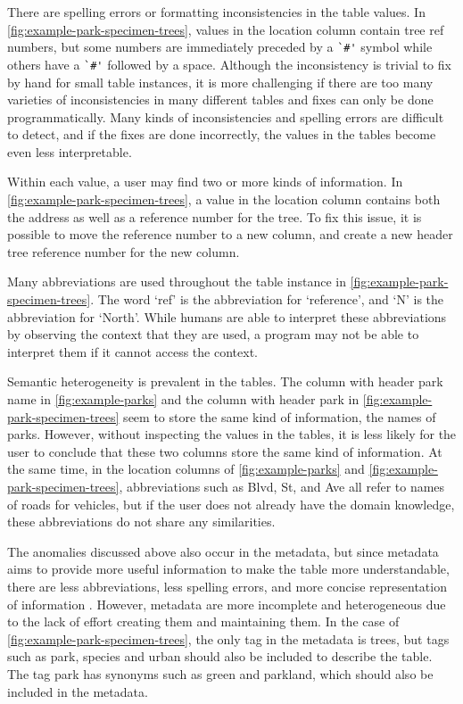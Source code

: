 There are spelling errors or formatting inconsistencies in the table values. In \autoref{fig:example-park-specimen-trees}, values in the location column contain tree ref numbers, but some numbers are immediately preceded by a \verb+`#'+ symbol while others have a \verb+`#'+ followed by a space. Although the inconsistency is trivial to fix by hand for small table instances, it is more challenging if there are too many varieties of inconsistencies in many different tables and fixes can only be done programmatically. Many kinds of inconsistencies and spelling errors are difficult to detect, and if the fixes are done incorrectly, the values in the tables become even less interpretable.

Within each value, a user may find two or more kinds of information. In \autoref{fig:example-park-specimen-trees}, a value in the location column contains both the address as well as a reference number for the tree. To fix this issue, it is possible to move the reference number to a new column, and create a new header tree reference number for the new column.

Many abbreviations are used throughout the table instance in \autoref{fig:example-park-specimen-trees}. The word `ref' is the abbreviation for `reference', and `N' is the abbreviation for `North'. While humans are able to interpret these abbreviations by observing the context that they are used, a program may not be able to interpret them if it cannot access the context.

Semantic heterogeneity is prevalent in the tables. The column with header park name in \autoref{fig:example-parks} and the column with header park in \autoref{fig:example-park-specimen-trees} seem to store the same kind of information, the names of parks. However, without inspecting the values in the tables, it is less likely for the user to conclude that these two columns store the same kind of information. At the same time, in the location columns of \autoref{fig:example-parks} and \autoref{fig:example-park-specimen-trees}, abbreviations such as Blvd, St, and Ave all refer to names of roads for vehicles, but if the user does not already have the domain knowledge, these abbreviations do not share any similarities.

The anomalies discussed above also occur in the metadata, but since metadata aims to provide more useful information to make the table more understandable, there are less abbreviations, less spelling errors, and more concise representation of information \cite{Rahm2016Case}. However, metadata are more incomplete and heterogeneous due to the lack of effort creating them and maintaining them. In the case of \autoref{fig:example-park-specimen-trees}, the only tag in the metadata is trees, but tags such as park, species and urban should also be included to describe the table. The tag park has synonyms such as green and parkland, which should also be included in the metadata.


